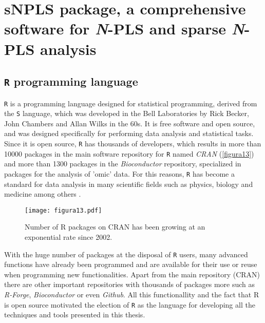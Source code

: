 
\chapter[sNPLS package, a comprehensive software for N-PLS and sparse N-PLS analysis]{sNPLS package, a comprehensive software for \textit{N}-PLS and sparse \textit{N}-PLS analysis}
\label{chapter:package}


\section{\texttt{R} programming language}
\texttt{R} \parencite{ihaka1996r, rsoftware} is a programming language designed for statistical programming, derived from the \texttt{S} language, which was developed in the Bell Laboratories by Rick Becker, John Chambers and Allan Wilks in the 60s. It is free software and open source, and was designed specifically for performing data analysis and statistical tasks. Since it is open source, \texttt{R} has thousands of developers, which results in more than 10000 packages in the main software repository for \texttt{R} named \textit{CRAN} (\autoref{figura13}) and more than 1300 packages in the \textit{Bioconductor} repository, specialized in packages for the analysis of 'omic' data. For this reasons, \texttt{R} has become a standard for data analysis in many scientific fields such as physics, biology and medicine among others \parencite{goztepe4facto}. 

\begin{figure}[hbtp]
	\centering
\texttt{[image: figura13.pdf]}
\caption[Number of R packages on CRAN since 2002]{Number of R packages on CRAN has been growing at an exponential rate since 2002.}
\label{figura13}
\end{figure}

With the huge number of packages at the disposal of \texttt{R} users, many advanced functions have already been programmed and are available for their use or reuse when programming new functionalities. Apart from the main repository (CRAN) there are other important repositories with thousands of packages more such as \textit{R-Forge}, \textit{Bioconductor} or even \textit{Github}. All this functionallity and the fact that R is open source motivated the election of \texttt{R} as the language for developing all the techniques and tools presented in this thesis.

